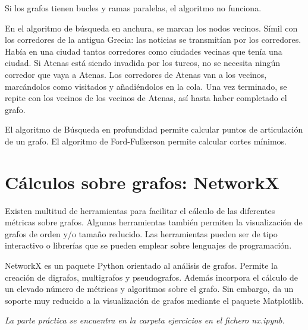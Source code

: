Si los grafos tienen bucles y ramas paralelas, el algoritmo no funciona. 

En el algoritmo de búsqueda en anchura, se marcan los nodos vecinos. Símil con los corredores de la antigua Grecia: las noticias se transmitían por los corredores. Había en una ciudad tantos corredores como ciudades vecinas que tenía una ciudad. Si Atenas está siendo invadida por los turcos, no se necesita ningún corredor que vaya a Atenas. Los corredores de Atenas van a los vecinos, marcándolos como visitados y añadiéndolos en la cola. Una vez terminado, se repite con los vecinos de los vecinos de Atenas, así hasta haber completado el grafo.

El algoritmo de Búsqueda en profundidad permite calcular puntos de articulación de un grafo.
El algoritmo de Ford-Fulkerson permite calcular cortes mínimos.

\section{Cálculos sobre grafos: NetworkX}
Existen multitud de herramientas para facilitar el cálculo de las diferentes métricas sobre grafos.
Algunas herramientas también permiten la visualización de grafos de orden y/o tamaño reducido.
Las herramientas pueden ser de tipo interactivo o librerías que se pueden emplear sobre lenguajes de programación.

NetworkX es un paquete Python orientado al análisis de grafos. Permite la creación de digrafos, multigrafos y pseudografos. Además incorpora el cálculo de un elevado número de métricas y algoritmos sobre el grafo. Sin embargo, da un soporte muy reducido a la visualización de grafos mediante el paquete Matplotlib.

\textit{La parte práctica se encuentra en la carpeta ejercicios en el fichero nx.ipynb.}

